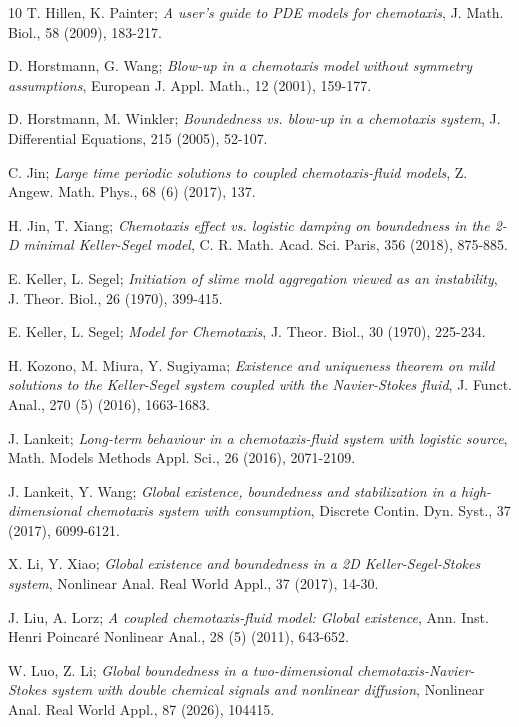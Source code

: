 \documentclass[reqno]{amsart}
\begin{document}
\begin{thebibliography}{10}
 T. Hillen, K. Painter;
\emph{A user's guide to PDE models for chemotaxis}, 
J. Math. Biol., 58 (2009), 183-217.

 D. Horstmann, G. Wang;
\emph{Blow-up in a chemotaxis model without symmetry assumptions}, 
European J. Appl. Math., 12 (2001), 159-177.

 D. Horstmann, M. Winkler;
\emph{Boundedness vs. blow-up in a chemotaxis system}, 
J. Differential Equations, 215 (2005), 52-107.

 C. Jin;
\emph{Large time periodic solutions to coupled chemotaxis-fluid models}, 
Z. Angew. Math. Phys., 68 (6) (2017), 137.

 H. Jin, T. Xiang;
\emph{Chemotaxis effect vs. logistic damping on boundedness in the 2-D minimal 
Keller-Segel model}, C. R. Math. Acad. Sci. Paris, 356 (2018), 875-885.

 E. Keller, L. Segel;
\emph{Initiation of slime mold aggregation viewed as an instability}, 
J. Theor. Biol., 26 (1970), 399-415.

 E. Keller, L. Segel;
\emph{Model for Chemotaxis}, J. Theor. Biol., 30 (1970), 225-234.

 H. Kozono, M. Miura, Y. Sugiyama;
\emph{Existence and uniqueness theorem on mild solutions to the Keller-Segel 
system coupled with the Navier-Stokes fluid}, 
J. Funct. Anal., 270 (5) (2016), 1663-1683.

 J. Lankeit;
\emph{Long-term behaviour in a chemotaxis-fluid system with logistic source}, 
Math. Models Methods Appl. Sci., 26 (2016), 2071-2109.

 J. Lankeit, Y. Wang;
\emph{Global existence, boundedness and stabilization in a high-dimensional 
chemotaxis system with consumption}, Discrete Contin. Dyn. Syst., 37 (2017), 6099-6121.

 X. Li, Y. Xiao;
\emph{Global existence and boundedness in a 2D Keller-Segel-Stokes system}, 
Nonlinear Anal. Real World Appl., 37 (2017), 14-30.

 J. Liu, A. Lorz;
\emph{A coupled chemotaxis-fluid model: Global existence},
 Ann. Inst. Henri Poincar\'e Nonlinear Anal., 28 (5) (2011), 643-652.

 W. Luo, Z. Li;
\emph{Global boundedness in a two-dimensional chemotaxis-Navier-Stokes system with 
double chemical signals and nonlinear diffusion}, 
Nonlinear Anal. Real World Appl., 87 (2026), 104415.


\end{thebibliography}
\end{document}
